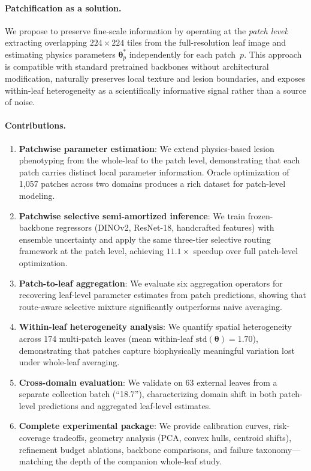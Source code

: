 \documentclass[11pt,a4paper]{article}
\newcommand{\btheta}{\boldsymbol{\theta}}
\begin{document}
\paragraph{Patchification as a solution.}
We propose to preserve fine-scale information by operating at the
\emph{patch level}: extracting overlapping $224{\times}224$ tiles from
the full-resolution leaf image and estimating physics parameters
$\btheta^*_p$ independently for each patch~$p$.
This approach is compatible with standard pretrained backbones without
architectural modification, naturally preserves local texture and
lesion boundaries, and exposes within-leaf heterogeneity as a
scientifically informative signal rather than a source of noise.

\paragraph{Contributions.}
\begin{enumerate}[leftmargin=*,itemsep=2pt]
\item \textbf{Patchwise parameter estimation}: We extend physics-based
  lesion phenotyping from the whole-leaf to the patch level,
  demonstrating that each patch carries distinct local parameter information.
  Oracle optimization of 1{,}057 patches across two domains produces
  a rich dataset for patch-level modeling.

\item \textbf{Patchwise selective semi-amortized inference}: We train
  frozen-backbone regressors (DINOv2, ResNet-18, handcrafted features)
  with ensemble uncertainty and apply the same three-tier selective
  routing framework at the patch level, achieving $11.1{\times}$
  speedup over full patch-level optimization.

\item \textbf{Patch-to-leaf aggregation}: We evaluate six aggregation
  operators for recovering leaf-level parameter estimates from patch
  predictions, showing that route-aware selective mixture
  significantly outperforms naive averaging.

\item \textbf{Within-leaf heterogeneity analysis}: We quantify spatial
  heterogeneity across 174 multi-patch leaves (mean within-leaf
  $\text{std}(\btheta) = 1.70$), demonstrating that patches capture
  biophysically meaningful variation lost under whole-leaf averaging.

\item \textbf{Cross-domain evaluation}: We validate on 63 external
  leaves from a separate collection batch (``18.7''), characterizing
  domain shift in both patch-level predictions and aggregated
  leaf-level estimates.

\item \textbf{Complete experimental package}: We provide calibration
  curves, risk-coverage tradeoffs, geometry analysis (PCA, convex hulls,
  centroid shifts), refinement budget ablations, backbone comparisons,
  and failure taxonomy---matching the depth of the companion whole-leaf study.
\end{enumerate}
\end{document}
